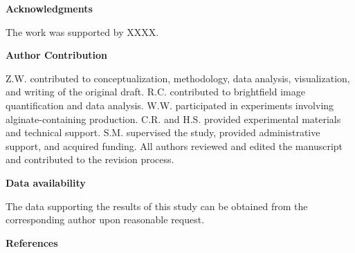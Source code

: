 \documentclass[
]{article}
\begin{document}
\textbf{Acknowledgments}

The work was supported by XXXX.

\textbf{Author Contribution}

Z.W. contributed to conceptualization, methodology, data analysis, visualization, and writing of the original draft. R.C. contributed to brightfield image quantification and data analysis. W.W. participated in experiments involving alginate-containing production. C.R. and H.S. provided experimental materials and technical support. S.M. supervised the study, provided administrative support, and acquired funding. All authors reviewed and edited the manuscript and contributed to the revision process.

\textbf{Data availability}

The data supporting the results of this study can be obtained from the corresponding author upon reasonable request.

\textbf{References}
\end{document}
